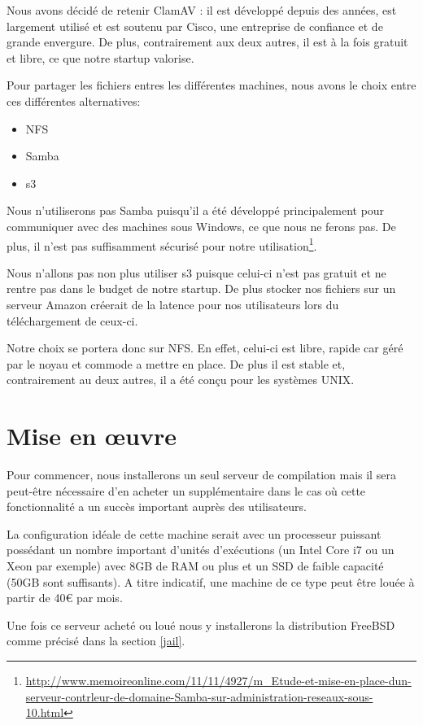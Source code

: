 \documentclass[10pt,a4paper]{article}
\begin{document}
Nous avons décidé de retenir ClamAV : il est développé depuis des années, est largement utilisé et est soutenu par Cisco, une entreprise de confiance et de grande envergure. De plus, contrairement aux deux autres, il est à la fois gratuit et libre, ce que notre startup valorise.

Pour partager les fichiers entres les différentes machines, nous avons le choix entre ces différentes alternatives:
\begin{itemize}
    \item{NFS}
    \item{Samba}
    \item{s3}
\end{itemize}

Nous n'utiliserons pas Samba puisqu'il a été développé principalement pour communiquer avec des machines sous Windows, ce que nous ne ferons pas. De plus, il n'est pas suffisamment sécurisé pour notre utilisation\footnote{\url{http://www.memoireonline.com/11/11/4927/m_Etude-et-mise-en-place-dun-serveur-contrleur-de-domaine-Samba-sur-administration-reseaux-sous-10.html}}.

Nous n'allons pas non plus utiliser s3 puisque celui-ci n'est pas gratuit et ne rentre pas dans le budget de notre startup. De plus stocker nos fichiers sur un serveur Amazon créerait de la latence pour nos utilisateurs lors du téléchargement de ceux-ci.

Notre choix se portera donc sur NFS. En effet, celui-ci est libre, rapide car géré par le noyau et commode a mettre en place. De plus il est stable et, contrairement au deux autres, il a été conçu pour les systèmes UNIX.


\section{Mise en œuvre}

Pour commencer, nous installerons un seul serveur de compilation mais il sera peut-être nécessaire d'en acheter un supplémentaire dans le cas où cette fonctionnalité a un succès important auprès des utilisateurs.

La configuration idéale de cette machine serait avec un processeur puissant possédant un nombre important d'unités d'exécutions (un Intel Core i7 ou un Xeon par exemple) avec 8GB de RAM ou plus et un SSD de faible capacité (50GB sont suffisants).
A titre indicatif, une machine de ce type peut être louée à partir de 40\euro { }par mois.


Une fois ce serveur acheté ou loué nous y installerons la distribution FreeBSD comme précisé dans la section \ref{jail}.
\end{document}
